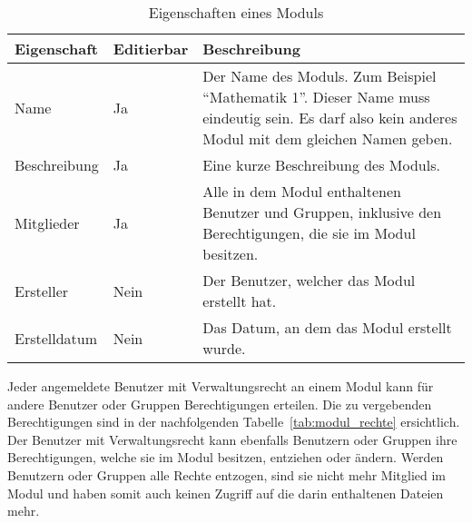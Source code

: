 \begin{table}[H]
\begin{tabularx}{\textwidth}{|l|l|X|} \hline
\textbf{Eigenschaft} &\textbf{Editierbar} & \textbf{Beschreibung} \\ \hline
Name				& Ja 	& Der Name des Moduls. Zum Beispiel “Mathematik 1”. Dieser Name muss eindeutig sein. Es darf also kein anderes Modul mit dem gleichen Namen geben.\\ \hline
Beschreibung		& Ja 	& Eine kurze Beschreibung des Moduls.\\ \hline
Mitglieder			& Ja 	& Alle in dem Modul enthaltenen Benutzer und Gruppen, inklusive den Berechtigungen, die sie im Modul besitzen.\\ \hline
Ersteller	 		& Nein 	& Der Benutzer, welcher das Modul erstellt hat.\\ \hline
Erstelldatum		& Nein 	& Das Datum, an dem das Modul erstellt wurde.\\ \hline
\end{tabularx}
\caption{Eigenschaften eines Moduls}
\label{tab:modul_eigenschaften}
\end{table}

Jeder angemeldete Benutzer mit Verwaltungsrecht an einem Modul kann für andere Benutzer oder Gruppen Berechtigungen erteilen. Die zu vergebenden Berechtigungen sind in der nachfolgenden Tabelle~\ref{tab:modul_rechte} ersichtlich.
Der Benutzer mit Verwaltungsrecht kann ebenfalls Benutzern oder Gruppen ihre Berechtigungen, welche sie im Modul besitzen, entziehen oder ändern. Werden Benutzern oder Gruppen alle Rechte entzogen, sind sie nicht mehr Mitglied im Modul und haben somit auch keinen Zugriff auf die darin enthaltenen Dateien mehr.


